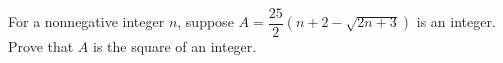 For a nonnegative integer $n$, suppose $A=\dfrac{25}{2}(n+2-\sqrt{2n+3})$ is an integer. Prove that $A$ is the square of an integer.
